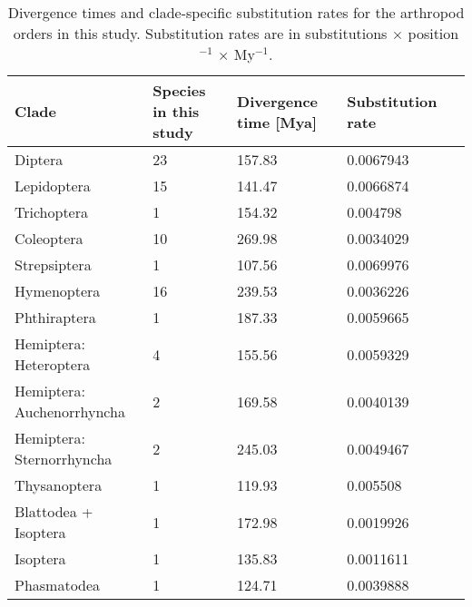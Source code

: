 \begin{table}
\centering
\caption[Divergence times and clade-specific substitution rates]{Divergence times and clade-specific substitution rates for the arthropod orders in this study. Substitution rates are in substitutions $\times$ position$^{-1}$ $\times$ My$^{-1}$.}
\label{tab:order-divergence-times}
\begin{tabular}{@{}lllll@{}}
\toprule
Clade                      & Species in this study & Divergence time [Mya] & Substitution rate \\ \midrule
Diptera                    & 23                    & 157.83                    & 0.0067943                     \\
Lepidoptera                & 15                    & 141.47                    & 0.0066874                     \\
Trichoptera                & 1                     & 154.32                    & 0.004798                      \\
Coleoptera                 & 10                    & 269.98                    & 0.0034029                     \\
Strepsiptera               & 1                     & 107.56                    & 0.0069976                     \\
Hymenoptera                & 16                    & 239.53                    & 0.0036226                     \\
Phthiraptera               & 1                     & 187.33                    & 0.0059665                     \\
Hemiptera: Heteroptera     & 4                     & 155.56                    & 0.0059329                     \\
Hemiptera: Auchenorrhyncha & 2                     & 169.58                    & 0.0040139                     \\
Hemiptera: Sternorrhyncha  & 2                     & 245.03                    & 0.0049467                     \\
Thysanoptera               & 1                     & 119.93                    & 0.005508                      \\
Blattodea + Isoptera       & 1                     & 172.98                    & 0.0019926                     \\
Isoptera                   & 1                     & 135.83                    & 0.0011611                     \\
Phasmatodea                & 1                     & 124.71                    & 0.0039888                     \\

\end{tabular}
\end{table}
